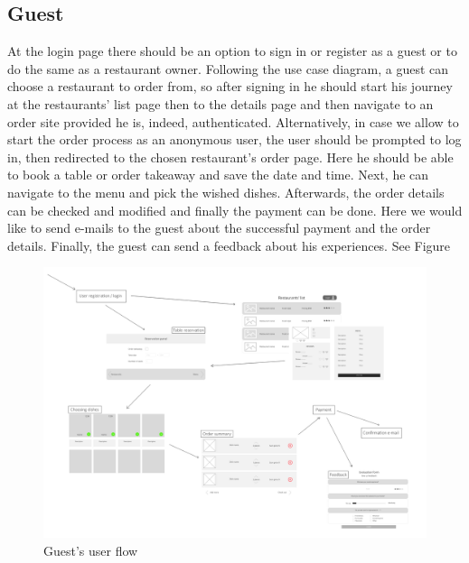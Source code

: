 \subsection{Guest}\label{GuestUserflow}
At the login page there should be an option to sign in or register as a guest or to do the same as a restaurant owner. Following the use case diagram, a guest can choose a restaurant to order from, so after signing in he should start his journey at the restaurants' list page then to the details page and then navigate to an order site provided he is, indeed, authenticated. Alternatively, in case we allow to start the order process as an anonymous user, the user should be prompted to log in, then redirected to the chosen restaurant's order page. Here he should be able to book a table or order takeaway and save the date and time. Next, he can navigate to the menu and pick the wished dishes. Afterwards, the order details can be checked and modified and finally the payment can be done. Here we would like to send e-mails to the guest about the successful payment and the order details. Finally, the guest can send a feedback about his experiences. See Figure 
\begin{figure}[!ht]
	\centering
	\includegraphics[width=150mm, keepaspectratio]{figures/UIsGuest.png}
	\caption{Guest's user flow} 
	\label{fig:UIsGuest}
\end{figure}
